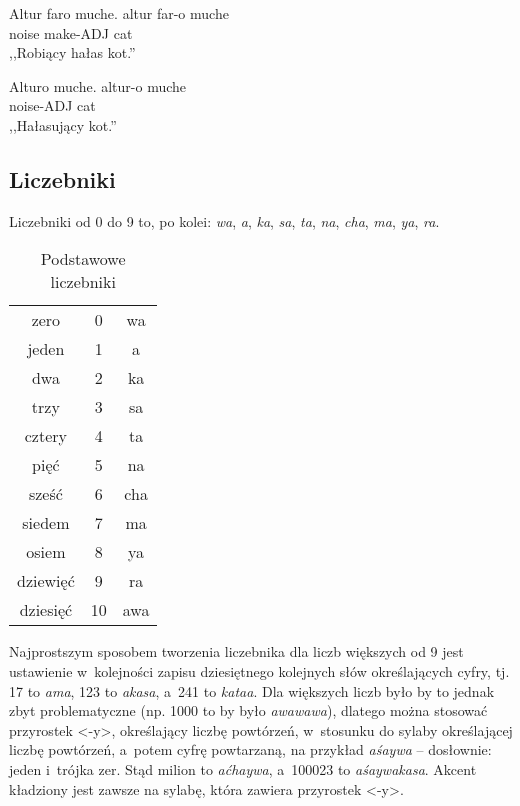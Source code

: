 \begin{spacing}{1.1}
\begin{exe}
	\ex
	\trans Altur faro muche.
	\gll altur far-o muche\\
	  noise make-ADJ cat\\
	\glt  ,,Robiący hałas kot.''
\end{exe}

\begin{exe}
	\ex
	\trans Alturo muche.
	\gll altur-o muche\\
	  noise-ADJ cat\\
	\glt  ,,Hałasujący kot.''
\end{exe}

\subsection{Liczebniki}

Liczebniki od 0 do 9 to, po kolei: \emph{wa}, \emph{a}, \emph{ka}, \emph{sa}, 
\emph{ta}, \emph{na}, \emph{cha}, \emph{ma}, \emph{ya}, \emph{ra}.

\begin{table}[ht]
	\centering
	\caption{Podstawowe liczebniki}
	\begin{tabular}{ccc} \toprule
		zero & 0 & wa \\
		jeden & 1 & a \\
		dwa & 2 & ka \\
		trzy & 3 & sa \\
		cztery & 4 & ta \\
		pięć & 5 & na \\
		sześć & 6 & cha \\
		siedem & 7 & ma \\
		osiem & 8 & ya \\
		dziewięć & 9 & ra \\
		dziesięć & 10 & awa \\\bottomrule
	\end{tabular}
	\label{tab:numerals}
\end{table}

Najprostszym sposobem tworzenia liczebnika dla liczb większych od 9 jest
ustawienie w~kolejności zapisu dziesiętnego kolejnych słów określających cyfry,
tj. 17 to \emph{ama}, 123 to \emph{akasa}, a~241 to \emph{kataa}. Dla większych
liczb było by to jednak zbyt problematyczne (np. 1000 to by było
\emph{awawawa}), dlatego można stosować przyrostek <-y>, określający liczbę
powtórzeń, w~stosunku do sylaby określającej liczbę powtórzeń, a~potem cyfrę
powtarzaną, na przykład \emph{aśaywa} -- dosłownie: jeden i~trójka zer. Stąd
milion to \emph{aćhaywa}, a~100023 to \emph{aśaywakasa}. Akcent kładziony jest
zawsze na sylabę, która zawiera przyrostek <-y>.


\end{spacing}
